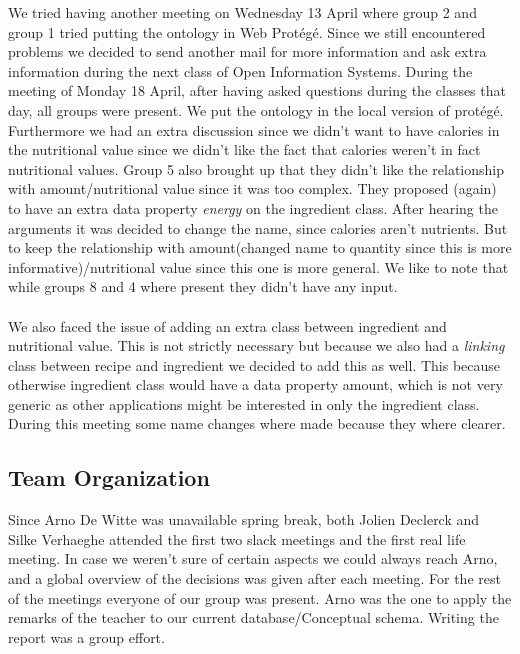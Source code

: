 \noindent
We tried having another meeting on Wednesday 13 April where group 2 and group 1 tried putting the ontology in Web Protégé. Since we still encountered problems we decided to send another mail for more information and ask extra information during the next class of Open Information Systems. 
\newline
\newline
\noindent
During the meeting of Monday 18 April, after having asked questions during the classes that day, all groups were present. We put the ontology in the local version of prot\'eg\'e. Furthermore we had an extra discussion since we didn't want to have calories in the nutritional value since we didn't like the fact that calories weren't in fact nutritional values. Group 5 also brought up that they didn't like the relationship with amount/nutritional value since it was too complex. They proposed (again) to have an extra data property \emph{energy} on the ingredient class. After hearing the arguments it was decided to change the name, since calories aren't nutrients. But to keep the relationship with amount(changed name to quantity since this is more informative)/nutritional value since this one is more general. We like to note that while groups 8 and 4 where present they didn't have any input.\\ \\
We also faced the issue of adding an extra class between ingredient and nutritional value. This is not strictly necessary but because we also had a \emph{linking} class between recipe and ingredient we decided to add this as well. This because otherwise ingredient class would have a data property amount, which is not very generic as other applications might be interested in only the ingredient class. During this meeting some name changes where made because they where clearer.

\subsection{Team Organization}

Since Arno De Witte was unavailable spring break, both Jolien Declerck and Silke Verhaeghe attended the first two slack meetings and the first real life meeting. In case we weren't sure of certain aspects we could always reach Arno, and a global overview of the decisions was given after each meeting. For the rest of the meetings everyone of our group was present. Arno was the one to apply the remarks of the teacher to our current database/Conceptual schema. Writing the report was a group effort. 

